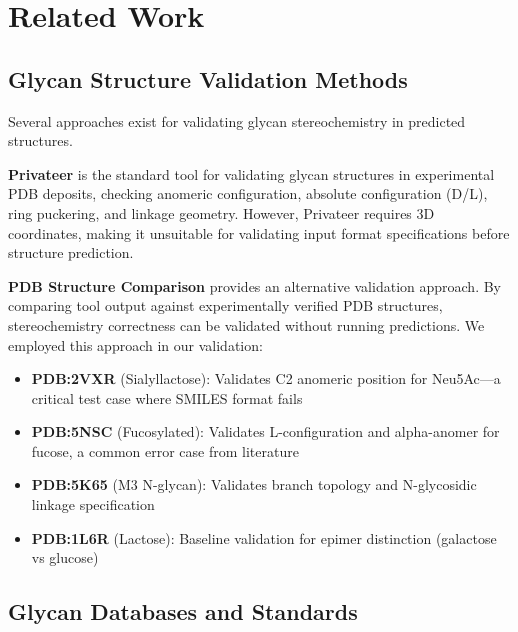 
\section{Related Work}

\subsection{Glycan Structure Validation Methods}

Several approaches exist for validating glycan stereochemistry in predicted structures. 

\textbf{Privateer} \citep{agirre2015} is the standard tool for validating glycan 
structures in experimental PDB deposits, checking anomeric configuration, 
absolute configuration (D/L), ring puckering, and linkage geometry. However, 
Privateer requires 3D coordinates, making it unsuitable for validating input 
format specifications before structure prediction.

\textbf{PDB Structure Comparison} provides an alternative validation approach. 
By comparing tool output against experimentally verified PDB structures, 
stereochemistry correctness can be validated without running predictions. 
We employed this approach in our validation:

\begin{itemize}
    \item \textbf{PDB:2VXR} (Sialyllactose): Validates C2 anomeric position 
    for Neu5Ac---a critical test case where SMILES format fails
    \item \textbf{PDB:5NSC} (Fucosylated): Validates L-configuration and 
    alpha-anomer for fucose, a common error case from literature
    \item \textbf{PDB:5K65} (M3 N-glycan): Validates branch topology and 
    N-glycosidic linkage specification
    \item \textbf{PDB:1L6R} (Lactose): Baseline validation for epimer 
    distinction (galactose vs glucose)
\end{itemize}

\subsection{Glycan Databases and Standards}

